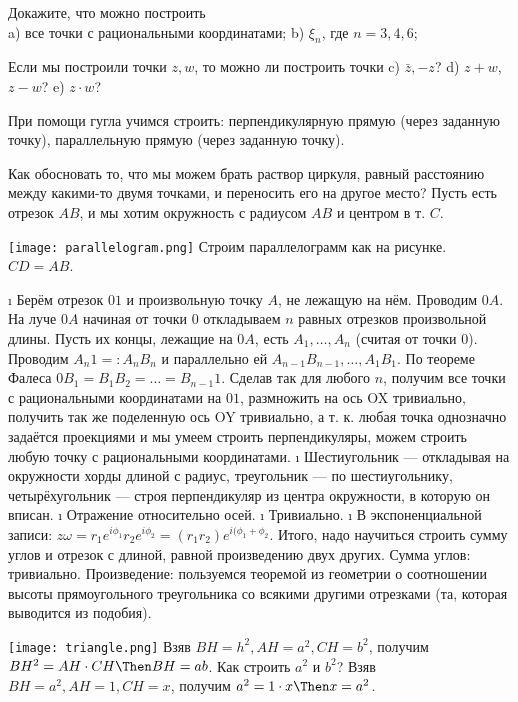 \begin{problem}[38(9.6)]
Докажите, что можно построить\\ 
a) все точки с рациональными координатами;
b) $\xi_n$, где $n=3,4,6$;

Если мы построили точки $z,w$, то можно ли построить точки 
c) $\bar{z},-z$? 
d) $z+w$, $z-w$?
e) $z\cdot w$?
\end{problem}

\begin{solution}
При помощи гугла учимся строить: перпендикулярную прямую (через заданную точку), параллельную прямую (через заданную точку).

Как обосновать то, что мы можем брать раствор циркуля, равный расстоянию между какими-то двумя точками, и переносить его на другое место?
Пусть есть отрезок \(AB\), и мы хотим окружность с радиусом \(AB\) и центром в т. \(C\).

\texttt{[image: parallelogram.png]}
Строим параллелограмм как на рисунке.
\(CD = AB\).

\begin{enumerate}[label=\asbuk{enumi})]
\i
  Берём отрезок \(01\) и произвольную точку \(A\), не лежащую на нём. Проводим \(0A\). На луче \(0A\) начиная от точки \(0\) откладываем \(n\) равных отрезков произвольной длины. Пусть их концы, лежащие на \(0A\), есть \(A_1, \dots, A_n\) (считая от точки \(0\)). Проводим \(A_n1 =: A_n B_n\) и параллельно ей \(A_{n-1}B_{n-1}, \dots, A_1B_1\). По теореме Фалеса \(0B_1 = B_1B_2 = \dots = B_{n-1}1\). Сделав так для любого \(n\), получим все точки с рациональными координатами на \(01\), размножить на ось OX тривиально, получить так же поделенную ось OY тривиально, а т. к. любая точка однозначно задаётся проекциями и мы умеем строить перпендикуляры, можем строить любую точку с рациональными координатами.
\i
  Шестиугольник --- откладывая на окружности хорды длиной с радиус, треугольник --- по шестиугольнику, четырёхугольник --- строя перпендикуляр из центра окружности, в которую он вписан.
\i
  Отражение относительно осей.
\i
  Тривиально.
\i
  В экспоненциальной записи: \(z\omega = r_1e^{i\phi_1}r_2e^{i\phi_2}=(r_1r_2)e^{i(\phi_1 +\phi_2}\).
  Итого, надо научиться строить сумму углов и отрезок с длиной, равной произведению двух других. Сумма углов: тривиально.
  Произведение: пользуемся теоремой из геометрии о соотношении высоты прямоугольного треугольника со всякими другими отрезками (та, которая выводится из подобия).

  \texttt{[image: triangle.png]}
  Взяв \(BH=h^2, AH=a^2, CH=b^2\), получим \(BH^2=AH\cdot CH \Then BH=ab\).
  Как строить \(a^2\) и \(b^2\)?
  Взяв \(BH=a^2, AH=1, CH=x\), получим \(a^2=1\cdot x \Then x=a^2\).
\end{enumerate}

\end{solution}

